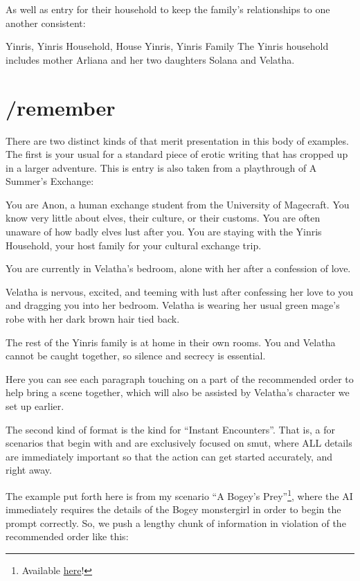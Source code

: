 \documentclass[Coomer-main.tex]{subfiles}
\begin{document}
As well as \wi entry for their household to keep the family’s relationships to one another consistent:

\begin{WI}{Yinris, Yinris Household, House Yinris, Yinris Family}
The Yinris household includes mother Arliana and her two daughters Solana and Velatha.
\end{WI}

\section{/remember}

There are two distinct kinds of \rem that merit presentation in this body of examples.
The first is your usual \rem for a standard piece of erotic writing that has cropped up in a larger adventure.
This is entry is also taken from a playthrough of A Summer’s Exchange:

\begin{/rm}
You are Anon, a human exchange student from the University of Magecraft.
You know very little about elves, their culture, or their customs.
You are often unaware of how badly elves lust after you.
You are staying with the Yinris Household, your host family for your cultural exchange trip.
\bigskip

You are currently in Velatha’s bedroom, alone with her after a confession of love.
\bigskip

Velatha is nervous, excited, and teeming with lust after confessing her love to you and dragging you into her bedroom.
Velatha is wearing her usual green mage’s robe with her dark brown hair tied back.
\bigskip

The rest of the Yinris family is at home in their own rooms.
You and Velatha cannot be caught together, so silence and secrecy is essential.
\end{/rm}

Here you can see each paragraph touching on a part of the recommended order to help bring a scene together, which will also be assisted by Velatha’s character \wi we set up earlier.

The second kind of \rem format is the kind for “Instant Encounters”.
That is, a \rem for scenarios that begin with and are exclusively focused on smut, where ALL details are immediately important so that the action can get started accurately, and right away.

The example put forth here is from my scenario “A Bogey’s Prey”\footnote{Available \href{https://play.aidungeon.io/main/scenarioView?publicId=a223b5c1-383a-11eb-bd76-6167ed773e5f}{here}!}, where the AI immediately requires the details of the Bogey monstergirl in order to begin the prompt correctly.
So, we push a lengthy chunk of information in violation of the recommended order like this:
\end{document}
